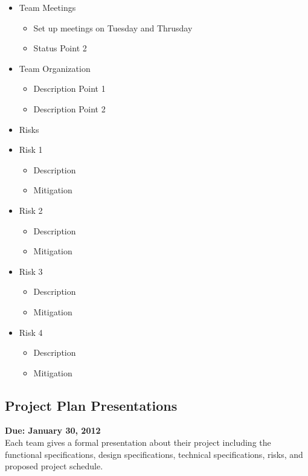 \documentclass[11pt,a4paper,oneside]{article}
\begin{document}
\begin{itemize}
\item Team Meetings
  \begin{itemize}
  \item Set up meetings on Tuesday and Thrusday
  \item Status Point 2
  \end{itemize}

\item Team Organization
  \begin{itemize}
  \item Description Point 1
  \item Description Point 2
  \end{itemize}

\item Risks

\item Risk 1
  \begin{itemize}
  \item Description
  \item Mitigation
  \end{itemize}

\item Risk 2
  \begin{itemize}
  \item Description
  \item Mitigation
  \end{itemize}

\item Risk 3
  \begin{itemize}
  \item Description
  \item Mitigation
  \end{itemize}

\item Risk 4\\
  \begin{itemize}
  \item Description
  \item Mitigation
  \end{itemize}

\end{itemize}


\subsection{Project Plan Presentations}
\textbf{Due: January 30, 2012}\\

Each team gives a formal presentation about their project including the functional specifications, design specifications, technical specifications, risks, and proposed project schedule.\\
\end{document}
